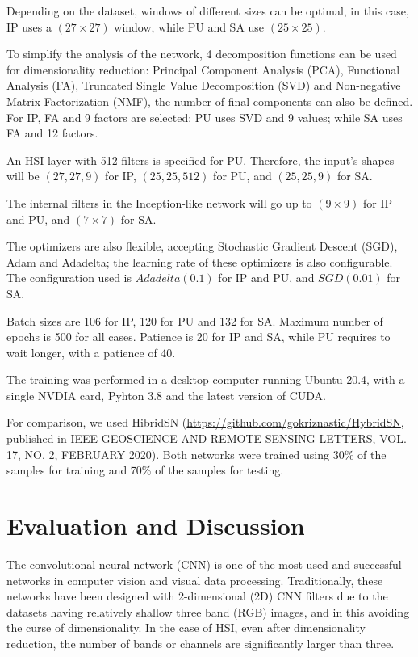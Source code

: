 \documentclass[lettersize, journal]{IEEEtran}
\begin{document}
Depending on the dataset, windows of different sizes can be optimal, in this case, IP uses a $(27\times 27)$ window, while PU and SA use $(25\times 25)$.  

To simplify the analysis of the network, 4 decomposition functions can be used for dimensionality reduction: Principal Component Analysis (PCA), Functional Analysis (FA), Truncated Single Value Decomposition (SVD) and Non-negative Matrix Factorization (NMF), the number of final components can also be defined. For IP, FA and 9 factors are selected; PU uses SVD and 9 values; while SA uses FA and 12 factors.

An HSI layer with 512 filters is specified for PU. Therefore, the input's shapes will be $(27, 27, 9)$ for IP, $(25, 25, 512)$ for PU, and $(25, 25, 9)$ for SA. 

The internal filters in the Inception-like network will go up to $(9 \times 9)$ for IP and PU, and $(7 \times 7)$ for SA. 

The optimizers are also flexible, accepting Stochastic Gradient Descent (SGD), Adam and Adadelta; the learning rate of these optimizers is also configurable. The configuration used is $Adadelta(0.1)$ for IP and PU, and $SGD(0.01)$ for SA.

Batch sizes are 106 for IP, 120 for PU and 132 for SA. Maximum number of epochs is 500  for all cases. Patience is 20 for IP and SA, while PU requires to wait longer, with a patience of 40.

The training was performed in a desktop computer running Ubuntu 20.4, with a single NVDIA card, Pyhton 3.8 and the latest version of CUDA.

For comparison, we used HibridSN (\url{https://github.com/gokriznastic/HybridSN}, published in IEEE GEOSCIENCE AND REMOTE SENSING LETTERS, VOL. 17, NO. 2, FEBRUARY 2020). Both networks were trained using 30\% of the samples for training and 70\% of the samples for testing. 

\section{Evaluation and Discussion}

The convolutional neural network (CNN) is one of the most used and successful networks in computer vision and visual data processing. Traditionally, these networks have been designed with 2-dimensional (2D) CNN filters due to the datasets having relatively shallow three band (RGB) images, and in this avoiding the curse of dimensionality. In the case of HSI, even after dimensionality reduction, the number of bands or channels are significantly larger than three. 
\end{document}
